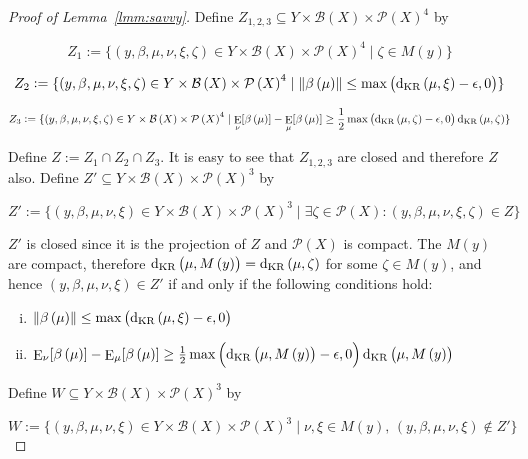 \documentclass[11pt]{article}
\theoremstyle{definition}
\theoremstyle{plain}
\newcommand{\N}[1]{\lVert #1 \rVert}
\DeclareMathOperator{\E}{E}
\newcommand{\PM}{\mathcal{P}}
\newcommand{\DKR}{\operatorname{d}_{\textnormal{KR}}}
\newcommand{\Gm}{\mathcal{B}}
\begin{document}
\begin{proof}[Proof of Lemma~\ref{lmm:savvy}]

Define $Z_{1,2,3} \subseteq Y \times \Gm\left(X\right) \times \PM\left(X\right)^4$ by

$$Z_1:=\{\left(y,\beta,\mu,\nu,\xi,\zeta\right) \in Y \times \Gm\left(X\right) \times \PM\left(X\right)^4 \mid \zeta \in M\left(y\right)\}$$

$$Z_2:=\{\left(y,\beta,\mu,\nu,\xi,\zeta\right) \in Y \times \Gm\left(X\right) \times \PM\left(X\right)^4 \mid \N{\beta\left(\mu\right)} \leq \max\left(\DKR\left(\mu,\xi\right) - \epsilon, 0\right)\}$$

$$Z_3:=\{\left(y,\beta,\mu,\nu,\xi,\zeta\right) \in Y \times \Gm\left(X\right) \times \PM\left(X\right)^4 \mid \E_\nu[\beta\left(\mu\right)] - \E_\mu[\beta\left(\mu\right)] \geq \frac{1}{2}\max\left(\DKR\left(\mu,\zeta\right) - \epsilon, 0\right) \DKR\left(\mu,\zeta\right)\}$$

Define $Z := Z_1 \cap Z_2 \cap Z_3$. It is easy to see that $Z_{1,2,3}$ are closed and therefore $Z$ also. Define $Z' \subseteq Y \times \Gm\left(X\right) \times \PM\left(X\right)^3$ by

$$Z':=\{\left(y,\beta,\mu,\nu,\xi\right) \in Y \times \Gm\left(X\right) \times \PM\left(X\right)^3 \mid \exists \zeta \in \PM\left(X\right): \left(y,\beta,\mu,\nu,\xi,\zeta\right) \in Z\}$$

$Z'$ is closed since it is the projection of $Z$ and $\PM\left(X\right)$ is compact. The $M\left(y\right)$ are compact, therefore $\DKR\left(\mu,M\left(y\right)\right)=\DKR\left(\mu,\zeta\right)$ for some $\zeta \in M\left(y\right)$, and hence $\left(y,\beta,\mu,\nu,\xi\right) \in Z'$ if and only if the following conditions hold:

\begin{enumerate}[i.]

\item $\N{\beta\left(\mu\right)} \leq \max\left(\DKR\left(\mu,\xi\right) - \epsilon, 0\right)$
\item $\E_\nu[\beta\left(\mu\right)] - \E_\mu[\beta\left(\mu\right)] \geq \frac{1}{2}\max\left(\DKR\left(\mu,M\left(y\right)\right) - \epsilon, 0\right) \DKR\left(\mu,M\left(y\right)\right)$

\end{enumerate}

Define $W \subseteq Y \times \Gm\left(X\right) \times \PM\left(X\right)^3$ by

$$W:=\{\left(y,\beta,\mu,\nu,\xi\right) \in Y \times \Gm\left(X\right) \times \PM\left(X\right)^3 \mid \nu,\xi \in M\left(y\right),\, \left(y,\beta,\mu,\nu,\xi\right) \not\in Z'\}$$


\end{proof}
\end{document}
